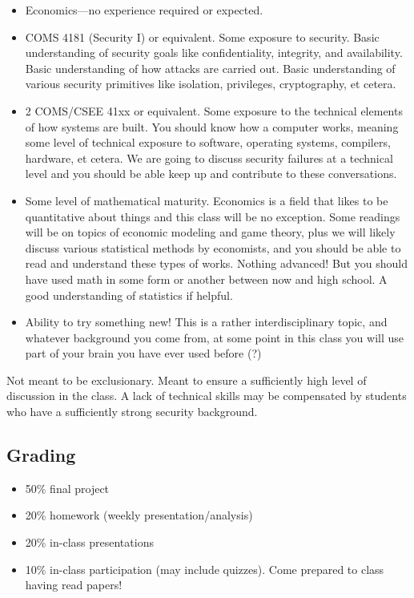 \documentclass[11pt]{article}
\begin{document}
\begin{itemize}
    \item Economics---no experience required or expected.
    \item COMS 4181 (Security I) or equivalent. Some exposure to security. Basic understanding of security goals like confidentiality, integrity, and availability. Basic understanding of how attacks are carried out. Basic understanding of various security primitives like isolation, privileges, cryptography, et cetera. 
    \item 2 COMS/CSEE 41xx or equivalent. Some exposure to the technical elements of how systems are built. You should know how a computer works, meaning some level of technical exposure to software, operating systems, compilers, hardware, et cetera. We are going to discuss security failures at a technical level and you should be able keep up and contribute to these conversations.
    \item Some level of mathematical maturity. Economics is a field that likes to be quantitative about things and this class will be no exception. Some readings will be on topics of economic modeling and game theory, plus we will likely discuss various statistical methods by economists, and you should be able to read and understand these types of works. Nothing advanced! But you should have used math in some form or another between now and high school. A good understanding of statistics if helpful.
    \item Ability to try something new! This is a rather interdisciplinary topic, and whatever background you come from, at some point in this class you will use part of your brain you have ever used before (?)
\end{itemize}

Not meant to be exclusionary. Meant to ensure a sufficiently high level of discussion in the class. 
A lack of technical skills may be compensated by students who have a sufficiently strong security background.


\subsection{Grading}

\begin{itemize}
    \item 50\% final project 
    \item 20\% homework (weekly presentation/analysis)
    \item 20\% in-class presentations
    \item 10\% in-class participation (may include quizzes). Come prepared to class having read papers! 
\end{itemize}
\end{document}

